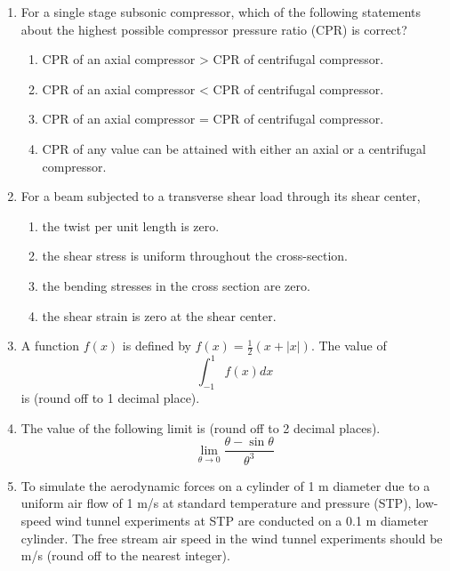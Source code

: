 \documentclass{article}
\begin{document}
\begin{enumerate}[leftmargin=*, resume]
\begin{multicols}{2}
\begin{enumerate}
 
\end{enumerate}
\end{multicols}

\item For a single stage subsonic compressor, which of the following statements about the highest possible compressor pressure ratio (CPR) is correct?
\begin{enumerate}
\item CPR of an axial compressor > CPR of centrifugal compressor.
\item CPR of an axial compressor < CPR of centrifugal compressor.
\item CPR of an axial compressor = CPR of centrifugal compressor.
\item CPR of any value can be attained with either an axial or a centrifugal compressor.
\end{enumerate}

\item For a beam subjected to a transverse shear load through its shear center,
\begin{multicols}{2}
\begin{enumerate}
\item the twist per unit length is zero.
\item the shear stress is uniform throughout the cross-section.
\item the bending stresses in the cross section are zero.
\item the shear strain is zero at the shear center.
\end{enumerate}
\end{multicols}

\item A function \( f(x) \) is defined by \( f(x) = \frac{1}{2} (x + |x|) \). The value of
\[
\int_{-1}^{1} f(x)  dx
\]
is \underline{\hspace{1.5cm}} (round off to 1 decimal place).

\item The value of the following limit is \underline{\hspace{1.5cm}} (round off to 2 decimal places).
\[
\lim_{\theta \to 0} \frac{\theta - \sin \theta}{\theta^3}
\]

\item To simulate the aerodynamic forces on a cylinder of 1 m diameter due to a uniform air flow of 1 m/s at standard temperature and pressure (STP), low-speed wind tunnel experiments at STP are conducted on a 0.1 m diameter cylinder. The free stream air speed in the wind tunnel experiments should be \underline{\hspace{1.5cm}} m/s (round off to the nearest integer).


\end{enumerate}
\end{document}
